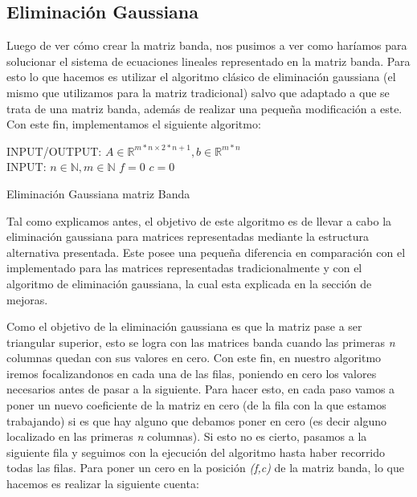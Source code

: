 \documentclass[10pt, a4paper]{article}
\begin{document}
\subsection{Eliminaci\'on Gaussiana}

Luego de ver c\'omo crear la matriz banda, nos pusimos a ver como har\'iamos para solucionar el sistema de ecuaciones lineales representado en la matriz banda. Para esto lo que hacemos es utilizar el algoritmo cl\'asico de eliminaci\'on gaussiana (el mismo que utilizamos para la matriz tradicional) salvo que adaptado a que se trata de una matriz banda, adem\'as de realizar una pequeña modificaci\'on a este. Con este fin, implementamos el siguiente algoritmo:

\begin{algorithm}[H]
INPUT/OUTPUT: $A \in \mathbb{R}^{m*n \times 2*n+1}, b \in \mathbb{R}^{m*n}$ \\
INPUT: $n \in \mathbb{N}, m \in \mathbb{N}$\;
$f = 0$\;
$c = 0$\;
\caption{Eliminaci\'on Gaussiana matriz Banda}
\end{algorithm}

Tal como explicamos antes, el objetivo de este algoritmo es de llevar a cabo la eliminaci\'on gaussiana para matrices representadas mediante la estructura alternativa presentada. Este posee una pequeña diferencia en comparaci\'on con el implementado para las matrices representadas tradicionalmente y con el algoritmo de eliminaci\'on gaussiana, la cual esta explicada en la secci\'on de mejoras.

Como el objetivo de la eliminaci\'on gaussiana es que la matriz pase a ser triangular superior, esto se logra con las matrices banda cuando las primeras \textit{n} columnas quedan con sus valores en cero. Con este fin, en nuestro algoritmo iremos focalizandonos en cada una de las filas, poniendo en cero los valores necesarios antes de pasar a la siguiente. Para hacer esto, en cada paso vamos a poner un nuevo coeficiente de la matriz en cero (de la fila con la que estamos trabajando) si es que hay alguno que debamos poner en cero (es decir alguno localizado en las primeras \textit{n} columnas). Si esto no es cierto, pasamos a la siguiente fila y seguimos con la ejecuci\'on del algoritmo hasta haber recorrido todas las filas. Para poner un cero en la posici\'on \textit{(f,c)} de la matriz banda, lo que hacemos es realizar la siguiente cuenta:
\end{document}
